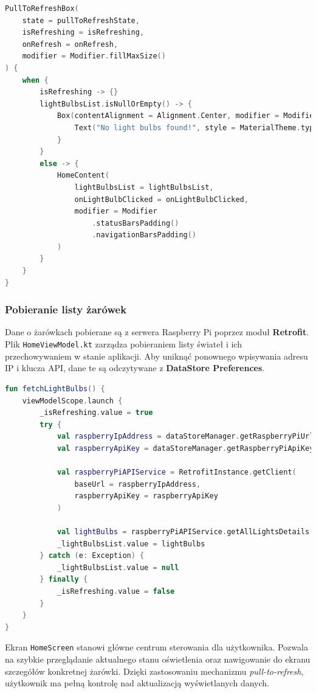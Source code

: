 \documentclass[12pt]{article}
\begin{document}
\begin{lstlisting}[language=Kotlin]
PullToRefreshBox(
    state = pullToRefreshState,
    isRefreshing = isRefreshing,
    onRefresh = onRefresh,
    modifier = Modifier.fillMaxSize()
) {
    when {
        isRefreshing -> {}
        lightBulbsList.isNullOrEmpty() -> {
            Box(contentAlignment = Alignment.Center, modifier = Modifier.fillMaxSize()) {
                Text("No light bulbs found!", style = MaterialTheme.typography.bodyLarge)
            }
        }
        else -> {
            HomeContent(
                lightBulbsList = lightBulbsList,
                onLightBulbClicked = onLightBulbClicked,
                modifier = Modifier
                    .statusBarsPadding()
                    .navigationBarsPadding()
            )
        }
    }
}
\end{lstlisting}

\subsubsection*{Pobieranie listy żarówek}
\noindent Dane o żarówkach pobierane są z serwera Raspberry Pi poprzez moduł \textbf{Retrofit}. Plik \texttt{HomeViewModel.kt} zarządza pobieraniem listy świateł i ich przechowywaniem w stanie aplikacji.
Aby uniknąć ponownego wpisywania adresu IP i klucza API, dane te są odczytywane z \textbf{DataStore Preferences}.

\begin{lstlisting}[language=Kotlin]
fun fetchLightBulbs() {
    viewModelScope.launch {
        _isRefreshing.value = true
        try {
            val raspberryIpAddress = dataStoreManager.getRaspberryPiUrl()
            val raspberryApiKey = dataStoreManager.getRaspberryPiApiKey()

            val raspberryPiAPIService = RetrofitInstance.getClient(
                baseUrl = raspberryIpAddress,
                raspberryApiKey = raspberryApiKey
            )

            val lightBulbs = raspberryPiAPIService.getAllLightsDetails().body()
            _lightBulbsList.value = lightBulbs
        } catch (e: Exception) {
            _lightBulbsList.value = null
        } finally {
            _isRefreshing.value = false
        }
    }
}
\end{lstlisting}

\noindent Ekran \texttt{HomeScreen} stanowi główne centrum sterowania dla użytkownika. Pozwala na szybkie przeglądanie aktualnego stanu oświetlenia oraz nawigowanie do ekranu szczegółów konkretnej
żarówki. Dzięki zastosowaniu mechanizmu \textit{pull-to-refresh}, użytkownik ma pełną kontrolę nad aktualizacją wyświetlanych danych.
\end{document}
